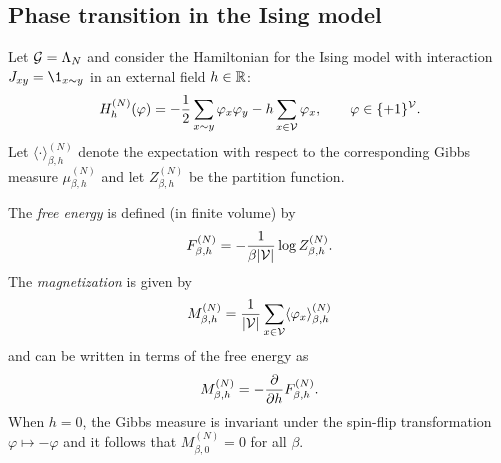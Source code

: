 
\subsection{Phase transition in the Ising model}


Let $\mathcal{G} = \Lambda_N$ and consider the Hamiltonian for the Ising model with
interaction $J_{xy} = \1_{x\sim y}$ in an external field $h\in{\mathbb R}$:
\begin{equation}
H^{(N)}_h(\varphi)
	=
-\frac12 \sum_{x \sim y} \varphi_x \varphi_y
- h \sum_{x\in\mathcal{V}} \varphi_x,
	\qquad
\varphi\in\{+1\}^{\mathcal{V}}.
\end{equation}
Let $\langle\cdot\rangle^{(N)}_{\beta,h}$ denote the expectation with respect to
the corresponding Gibbs measure $\mu^{(N)}_{\beta,h}$ and let $Z^{(N)}_{\beta,h}$
be the partition function.

The \emph{free energy} is defined (in finite volume) by
\begin{equation}
F^{(N)}_{\beta,h}
	=
-\frac{1}{\beta |\mathcal{V}|} \log Z^{(N)}_{\beta,h}.
\end{equation}
The \emph{magnetization} is given by
\begin{equation}
M^{(N)}_{\beta,h}
	=
\frac{1}{|\mathcal{V}|} \sum_{x\in \mathcal{V}} \langle \varphi_x \rangle^{(N)}_{\beta,h}
\end{equation}
and can be written in terms of the free energy as
\begin{equation}
M^{(N)}_{\beta,h}
	=
-\frac{\partial }{\partial h} F^{(N)}_{\beta,h}.
\end{equation}
When $h = 0$, the Gibbs measure is invariant under the spin-flip transformation
$\varphi \mapsto -\varphi$ and it follows that $M^{(N)}_{\beta,0} = 0$ for all $\beta$.

